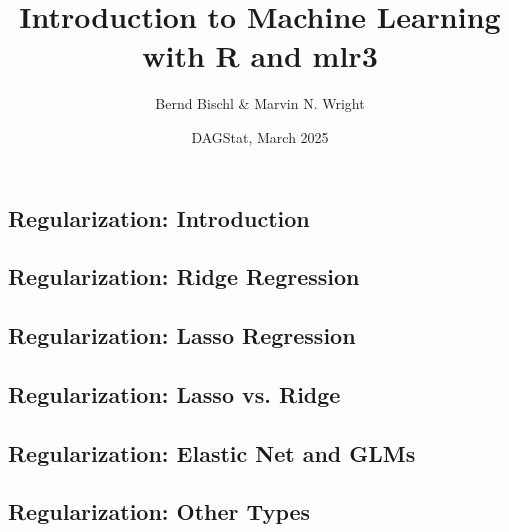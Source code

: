 \documentclass[13pt,compress]{beamer}
\title{Introduction to Machine Learning\\with R and mlr3}
\author{Bernd Bischl \& Marvin N. Wright}
\date{DAGStat, March 2025}
\begin{document}


\frame{\titlepage}

\subsection{Regularization: Introduction}


\subsection{Regularization: Ridge Regression}


\subsection{Regularization: Lasso Regression}


\subsection{Regularization: Lasso vs. Ridge}


\subsection{Regularization: Elastic Net and GLMs}


%

\subsection{Regularization: Other Types}

\end{document}
